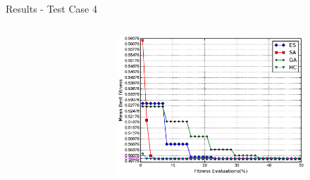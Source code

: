 \documentclass{beamer}
\begin{document}
\begin{frame}{Results - Test Case 4}
\begin{columns}
\begin{column}{.5\columnwidth}
\begin{figure}
\begin{subfigure}{\columnwidth}
                \end{subfigure}\hfill%
            \end{figure}
        \end{column}
        \begin{column}{.6\columnwidth}
            \begin{figure}
                \begin{subfigure}{\columnwidth}
                    \includegraphics[width=\columnwidth,height=\columnwidth]{../paper/FIG/tc4_mf}%
                \end{subfigure}\hfill\\%
            \end{figure}
        \end{column}
    \end{columns}
\end{frame}
\end{document}
